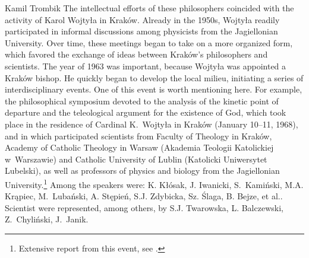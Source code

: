 \begin{artengenv}{Kamil Trombik}
The intellectual efforts of these philosophers coincided with the activity of Karol Wojtyła in Kraków. Already in the
1950s, Wojtyła readily participated in informal discussions among physicists from the Jagiellonian University. Over
time, these meetings began to take on a more organized form, which favored the exchange of ideas between Kraków's
philosophers and scientists. The year of 1963 was important, because Wojtyła was appointed a Kraków bishop. He quickly
began to develop the local milieu, initiating a series of interdisciplinary events. One of this event is worth mentioning
here. For example, the philosophical symposium devoted to the analysis of the kinetic point of departure and the
teleological argument for the existence of God, which took place in the residence of Cardinal K.~Wojtyła in Kraków
(January 10--11, 1968), and in which participated scientists from Faculty of Theology in Kraków, Academy of Catholic
Theology in Warsaw (Akademia Teologii Katolickiej w~Warszawie) and Catholic University of Lublin (Katolicki Uniwersytet
Lubelski), as well as professors of physics and biology from the Jagiellonian
University.\footnote{Extensive report from this event, see
\parencite{morawiec_sympozjum_1968}.
} Among the speakers were: K. Kłósak,
J. Iwanicki, S.~Kamiński, M.A. Krąpiec, M.~Lubański, A. Stępień, S.J. Zdybicka, Sz. Ślaga, B. Bejze, et al.. Scientist
were represented, among others, by S.J. Twarowska, L. Balczewski, Z.~Chyliński, J.~Janik.


\end{artengenv}
